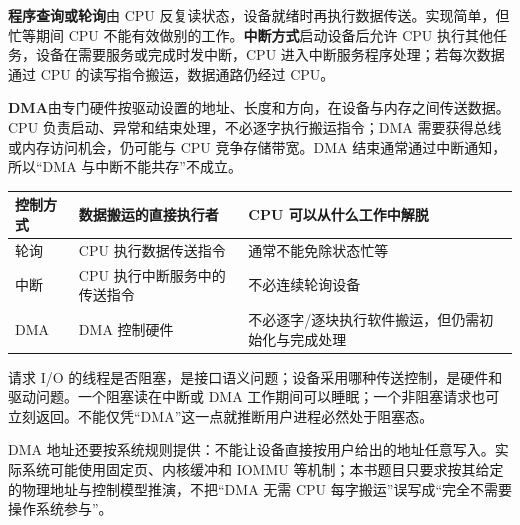 \textbf{程序查询或轮询}由 CPU 反复读状态，设备就绪时再执行数据传送。实现简单，但忙等期间 CPU 不能有效做别的工作。\textbf{中断方式}启动设备后允许 CPU 执行其他任务，设备在需要服务或完成时发中断，CPU 进入中断服务程序处理；若每次数据通过 CPU 的读写指令搬运，数据通路仍经过 CPU。

\textbf{DMA}由专门硬件按驱动设置的地址、长度和方向，在设备与内存之间传送数据。CPU 负责启动、异常和结束处理，不必逐字执行搬运指令；DMA 需要获得总线或内存访问机会，仍可能与 CPU 竞争存储带宽。DMA 结束通常通过中断通知，所以``DMA 与中断不能共存''不成立。

\begin{wideblock}

\par\medskip\noindent\begin{minipage}{\linewidth}\fontsize{9.3}{12}\selectfont\begin{tabularx}{\linewidth}{@{}YYY@{}}
\toprule\noalign{}
\begin{minipage}[b]{\linewidth}\raggedright
控制方式
\end{minipage} & \begin{minipage}[b]{\linewidth}\raggedright
数据搬运的直接执行者
\end{minipage} & \begin{minipage}[b]{\linewidth}\raggedright
CPU 可以从什么工作中解脱
\end{minipage} \\
\midrule\noalign{}


轮询 & CPU 执行数据传送指令 & 通常不能免除状态忙等 \\
中断 & CPU 执行中断服务中的传送指令 & 不必连续轮询设备 \\
DMA & DMA 控制硬件 & 不必逐字/逐块执行软件搬运，但仍需初始化与完成处理 \\
\bottomrule\end{tabularx}
\end{minipage}\par\medskip

\end{wideblock}

请求 I/O 的线程是否阻塞，是接口语义问题；设备采用哪种传送控制，是硬件和驱动问题。一个阻塞读在中断或 DMA 工作期间可以睡眠；一个非阻塞请求也可立刻返回。不能仅凭``DMA''这一点就推断用户进程必然处于阻塞态。

DMA 地址还要按系统规则提供：不能让设备直接按用户给出的地址任意写入。实际系统可能使用固定页、内核缓冲和 IOMMU 等机制；本书题目只要求按其给定的物理地址与控制模型推演，不把``DMA 无需 CPU 每字搬运''误写成``完全不需要操作系统参与''。

